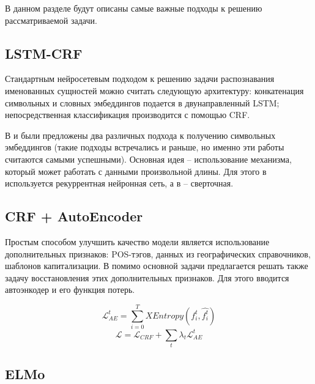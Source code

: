 \documentclass[a4paper,14pt]{extarticle}
\begin{document}
В данном разделе будут описаны самые важные подходы к решению рассматриваемой задачи.

\subsection{LSTM-CRF}

Стандартным нейросетевым подходом к решению задачи распознавания именованных сущностей можно считать следующую архитектуру: конкатенация символьных и словных эмбеддингов подается в двунаправленный LSTM; непосредственная классификация производится с помощью CRF.

В \cite{1603.01360} и \cite{1603.01354} были предложены два различных подхода к получению символьных эмбеддингов (такие подходы встречались и раньше, но именно эти работы считаются самыми успешными). Основная идея -- использование механизма, который может работать с данными произвольной длины. Для этого в \cite{1603.01360} используется рекуррентная нейронная сеть, а в \cite{1603.01354} -- сверточная.



\clearpage

\subsection{CRF + AutoEncoder}

Простым способом улучшить качество модели является использование дополнительных признаков: POS-тэгов, данных из географических справочников, шаблонов капитализации. В \cite{1808.09075} помимо основной задачи предлагается решать также задачу восстановления этих дополнительных признаков. Для этого вводится автоэнкодер и его функция потерь.

$$\mathcal{L}_{AE}^{t} = \sum_{i=0}^{T}{XEntropy(f_{i}^{t},\hat{f_{i}^{t}})}$$
$$\mathcal{L} = \mathcal{L}_{CRF} + \sum_{t}{\lambda_{t}\mathcal{L}_{AE}^{t}}$$


\clearpage

\subsection{ELMo}
\end{document}
